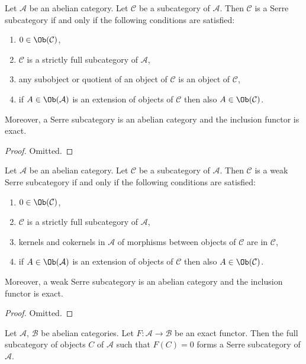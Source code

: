 \begin{lemma}
\label{lemma-characterize-serre-subcategory}
Let $\mathcal{A}$ be an abelian category.
Let $\mathcal{C}$ be a subcategory of $\mathcal{A}$.
Then $\mathcal{C}$ is a Serre subcategory if and only if
the following conditions are satisfied:
\begin{enumerate}
\item $0 \in \Ob(\mathcal{C})$,
\item $\mathcal{C}$ is a strictly full subcategory of $\mathcal{A}$,
\item any subobject or quotient of an object of $\mathcal{C}$ is an object
of $\mathcal{C}$,
\item if $A \in \Ob(\mathcal{A})$ is an extension of objects of $\mathcal{C}$
then also $A \in \Ob(\mathcal{C})$.
\end{enumerate}
Moreover, a Serre subcategory is an abelian category and
the inclusion functor is exact.
\end{lemma}

\begin{proof}
Omitted.
\end{proof}

\begin{lemma}
\label{lemma-characterize-weak-serre-subcategory}
Let $\mathcal{A}$ be an abelian category.
Let $\mathcal{C}$ be a subcategory of $\mathcal{A}$.
Then $\mathcal{C}$ is a weak Serre subcategory if and only if
the following conditions are satisfied:
\begin{enumerate}
\item $0 \in \Ob(\mathcal{C})$,
\item $\mathcal{C}$ is a strictly full subcategory of $\mathcal{A}$,
\item kernels and cokernels in $\mathcal{A}$ of morphisms
between objects of $\mathcal{C}$ are in $\mathcal{C}$,
\item if $A \in \Ob(\mathcal{A})$ is an extension of objects of $\mathcal{C}$
then also $A \in \Ob(\mathcal{C})$.
\end{enumerate}
Moreover, a weak Serre subcategory is an abelian category and
the inclusion functor is exact.
\end{lemma}

\begin{proof}
Omitted.
\end{proof}

\begin{lemma}
\label{lemma-kernel-exact-functor}
Let $\mathcal{A}$, $\mathcal{B}$ be abelian categories.
Let $F : \mathcal{A} \to \mathcal{B}$ be an exact functor.
Then the full subcategory of objects $C$ of $\mathcal{A}$
such that $F(C) = 0$ forms a Serre subcategory of $\mathcal{A}$.
\end{lemma}

